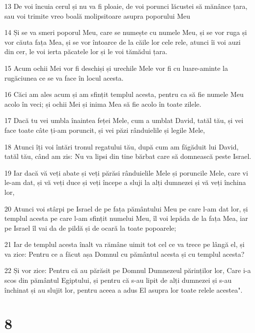 \par 13 De voi încuia cerul și nu va fi ploaie, de voi porunci lăcustei să mănânce țara, sau voi trimite vreo boală molipsitoare asupra poporului Meu
\par 14 Și se va smeri poporul Meu, care se numește cu numele Meu, și se vor ruga și vor căuta fața Mea, și se vor întoarce de la căile lor cele rele, atunci îi voi auzi din cer, le voi ierta păcatele lor și le voi tămădui țara.
\par 15 Acum ochii Mei vor fi deschiși și urechile Mele vor fi cu luare-aminte la rugăciunea ce se va face în locul acesta.
\par 16 Căci am ales acum și am sfințit templul acesta, pentru ca să fie numele Meu acolo în veci; și ochii Mei și inima Mea să fie acolo în toate zilele.
\par 17 Dacă tu vei umbla înaintea feței Mele, cum a umblat David, tatăl tău, și vei face toate câte ți-am poruncit, și vei păzi rânduielile și legile Mele,
\par 18 Atunci îți voi întări tronul regatului tău, după cum am făgăduit lui David, tatăl tău, când am zis: Nu va lipsi din tine bărbat care să domnească peste Israel.
\par 19 Iar dacă vă veți abate și veți părăsi rânduielile Mele și poruncile Mele, care vi le-am dat, și vă veți duce și veți începe a sluji la alți dumnezei și vă veți închina lor,
\par 20 Atunci voi stârpi pe Israel de pe fața pământului Meu pe care l-am dat lor, și templul acesta pe care l-am sfințit numelui Meu, îl voi lepăda de la fața Mea, iar pe Israel îl vai da de pildă și de ocară la toate popoarele;
\par 21 Iar de templul acesta înalt va rămâne uimit tot cel ce va trece pe lângă el, și va zice: Pentru ce a făcut așa Domnul cu pământul acesta și cu templul acesta?
\par 22 Și vor zice: Pentru că au părăsit pe Domnul Dumnezeul părinților lor, Care i-a scos din pământul Egiptului, și pentru că s-au lipit de alți dumnezei și s-au închinat și au slujit lor, pentru aceea a adus El asupra lor toate relele acestea".

\chapter{8}

